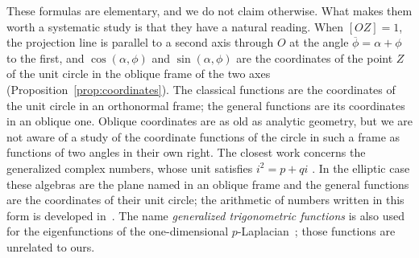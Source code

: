 \documentclass[11pt]{amsart}
\theoremstyle{definition}
\theoremstyle{remark}
\numberwithin{equation}{section}
\newcommand{\pb}{\overline{\phi}}
\begin{document}
These formulas are elementary, and we do not claim otherwise. What makes
them worth a systematic study is that they have a natural reading. When
$[OZ] = 1$, the projection line is parallel to a second axis through $O$
at the angle $\pb = \alpha+\phi$ to the first, and $\cos(\alpha,\phi)$
and $\sin(\alpha,\phi)$ are the coordinates of the point $Z$ of the unit
circle in the oblique frame of the two axes
(Proposition~\ref{prop:coordinates}). The classical functions are the
coordinates of the unit circle in an orthonormal frame; the general
functions are its coordinates in an oblique one. Oblique coordinates are
as old as analytic geometry, but we are not aware of a study of the
coordinate functions of the circle in such a frame as functions of two
angles in their own right. The closest work concerns the generalized
complex numbers, whose unit satisfies $i^2 = p + qi$
\cite{HarkinHarkin2004,KantorSolodovnikov1989,Yaglom1968}. In the
elliptic case these algebras are the plane named in an oblique frame and
the general functions are the coordinates of their unit circle; the
arithmetic of numbers written in this form is developed
in~\cite{DerrazGN}. The name \emph{generalized trigonometric
functions} is also used for the eigenfunctions of the one-dimensional
$p$-Laplacian~\cite{Lindqvist1995}; those functions are unrelated to
ours.
\end{document}
